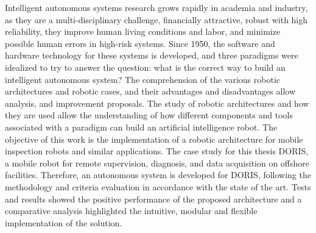 \begin{foreignabstract}

Intelligent autonomous systems research grows rapidly
in academia and industry, as they are a multi-disciplinary challenge,
financially attractive, robust with high reliability, they improve
human living conditions and labor, and minimize possible human errors in
high-risk systems. Since 1950, the software and hardware technology for these
systems is developed, and three paradigms were idealized to try to answer the
question: what is the correct way to build an intelligent autonomous system? The
comprehension of the various robotic architectures and robotic cases, and their
advantages and disadvantages allow analysis, and improvement proposals. The
study of robotic architectures and how they are used allow the
understanding of how different components and tools associated with a paradigm
can build an artificial intelligence robot. The objective of this work is
the implementation of a robotic architecture for mobile inspection robots and
similar applications. The case study for this thesis DORIS, a mobile robot for
remote supervision, diagnosis, and data acquisition on offshore facilities.
Therefore, an autonomous system is developed for DORIS, following the
methodology and criteria evaluation in accordance with the state of the art.
Tests and results showed the positive performance of the proposed architecture
and a comparative analysis highlighted the intuitive, modular and
flexible implementation of the solution.


\end{foreignabstract}

